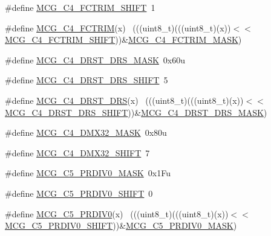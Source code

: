 \begin{DoxyCompactItemize}
\item 
\#define \hyperlink{group___m_c_g___register___masks_ga0a1b1f2be0b8e9afc3ff91ab11d71a1e}{M\+C\+G\+\_\+\+C4\+\_\+\+F\+C\+T\+R\+I\+M\+\_\+\+S\+H\+I\+FT}~1
\item 
\#define \hyperlink{group___m_c_g___register___masks_gae3b32644a70a2a5bf1a36f8dc0c09837}{M\+C\+G\+\_\+\+C4\+\_\+\+F\+C\+T\+R\+IM}(x)                                              ~(((uint8\+\_\+t)(((uint8\+\_\+t)(x))$<$$<$\hyperlink{group___m_c_g___register___masks_ga0a1b1f2be0b8e9afc3ff91ab11d71a1e}{M\+C\+G\+\_\+\+C4\+\_\+\+F\+C\+T\+R\+I\+M\+\_\+\+S\+H\+I\+FT}))\&\hyperlink{group___m_c_g___register___masks_ga91610035649d14c5027419db0bfa3231}{M\+C\+G\+\_\+\+C4\+\_\+\+F\+C\+T\+R\+I\+M\+\_\+\+M\+A\+SK})
\item 
\#define \hyperlink{group___m_c_g___register___masks_ga7f6629e8d17efb2cec3d2f63d09ede5a}{M\+C\+G\+\_\+\+C4\+\_\+\+D\+R\+S\+T\+\_\+\+D\+R\+S\+\_\+\+M\+A\+SK}~0x60u
\item 
\#define \hyperlink{group___m_c_g___register___masks_ga27d4baa0c8a770f1f67ab47e6407e948}{M\+C\+G\+\_\+\+C4\+\_\+\+D\+R\+S\+T\+\_\+\+D\+R\+S\+\_\+\+S\+H\+I\+FT}~5
\item 
\#define \hyperlink{group___m_c_g___register___masks_ga4cba7b614163bf1244629a1006509c37}{M\+C\+G\+\_\+\+C4\+\_\+\+D\+R\+S\+T\+\_\+\+D\+RS}(x)                                          ~(((uint8\+\_\+t)(((uint8\+\_\+t)(x))$<$$<$\hyperlink{group___m_c_g___register___masks_ga27d4baa0c8a770f1f67ab47e6407e948}{M\+C\+G\+\_\+\+C4\+\_\+\+D\+R\+S\+T\+\_\+\+D\+R\+S\+\_\+\+S\+H\+I\+FT}))\&\hyperlink{group___m_c_g___register___masks_ga7f6629e8d17efb2cec3d2f63d09ede5a}{M\+C\+G\+\_\+\+C4\+\_\+\+D\+R\+S\+T\+\_\+\+D\+R\+S\+\_\+\+M\+A\+SK})
\item 
\#define \hyperlink{group___m_c_g___register___masks_ga5d16ac35cf87b3cdeeefca1c16a0eda0}{M\+C\+G\+\_\+\+C4\+\_\+\+D\+M\+X32\+\_\+\+M\+A\+SK}~0x80u
\item 
\#define \hyperlink{group___m_c_g___register___masks_ga12d73b2d4a4fd1f2fb21a1cbe87aaa83}{M\+C\+G\+\_\+\+C4\+\_\+\+D\+M\+X32\+\_\+\+S\+H\+I\+FT}~7
\item 
\#define \hyperlink{group___m_c_g___register___masks_ga28ab0b9007f9941707395660db088172}{M\+C\+G\+\_\+\+C5\+\_\+\+P\+R\+D\+I\+V0\+\_\+\+M\+A\+SK}~0x1\+Fu
\item 
\#define \hyperlink{group___m_c_g___register___masks_ga452026beec3bec5a580d151e15d83f30}{M\+C\+G\+\_\+\+C5\+\_\+\+P\+R\+D\+I\+V0\+\_\+\+S\+H\+I\+FT}~0
\item 
\#define \hyperlink{group___m_c_g___register___masks_ga4671734fc6670aae81260260e8af1861}{M\+C\+G\+\_\+\+C5\+\_\+\+P\+R\+D\+I\+V0}(x)                                              ~(((uint8\+\_\+t)(((uint8\+\_\+t)(x))$<$$<$\hyperlink{group___m_c_g___register___masks_ga452026beec3bec5a580d151e15d83f30}{M\+C\+G\+\_\+\+C5\+\_\+\+P\+R\+D\+I\+V0\+\_\+\+S\+H\+I\+FT}))\&\hyperlink{group___m_c_g___register___masks_ga28ab0b9007f9941707395660db088172}{M\+C\+G\+\_\+\+C5\+\_\+\+P\+R\+D\+I\+V0\+\_\+\+M\+A\+SK})
$$
\end{DoxyCompactItemize}

